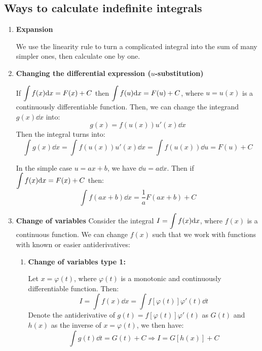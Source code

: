 \documentclass[12pt]{article}
\begin{document}
\subsection{Ways to calculate indefinite integrals}
\begin{enumerate}
    \item \textbf{Expansion} 
    \par We use the linearity rule to turn a complicated integral into the sum of many simpler ones, then calculate one by one. 
    \item \textbf{Changing the differential expression ($u$-substitution)}
\par If $\mathlarger{\int f(x) \dd x = F(x) + C}$ then $\mathlarger{\int f(u) \dd x = F(u) + C}$, where $u = u(x)$ is a continuously differentiable function. Then, we can change the integrand $g(x)\dd x$ into:
\begin{equation*}
    g(x) = f(u(x))u'(x) \dd x
\end{equation*}
Then the integral turns into:
\begin{equation*}
    \int g(x) \dd x = \int f(u(x))u'(x) \dd x = \int f(u(x)) \dd u = F(u) + C
\end{equation*}
\begin{insight}
    In the simple case $u = ax+b$, we have $\dd u = a \dd x$. Then if $\mathlarger{\int f(x) \dd x = F(x) + C}$ then:
    \begin{equation*}
        \int f(ax+b) \dd x  = \dfrac{1}{a} F(ax+b) +C
    \end{equation*}
\end{insight}
    \item \textbf{Change of variables}
Consider the integral $\mathlarger{I = \int f(x) \dd x}$, where $f(x)$ is a continuous function. We can change $f(x)$ such that we work with functions with known or easier antiderivatives:
\begin{enumerate}
    \item \textbf{Change of variables type 1:}
    \par Let $x = \varphi(t)$, where $\varphi(t)$ is a monotonic and continuously differentiable function. Then:
    \begin{equation*}
        I = \int f(x) \dd x = \int f[\varphi(t)]\varphi'(t) \dd t
    \end{equation*}
    Denote the antiderivative of $g(t) = f[\varphi(t)]\varphi'(t)$ as $G(t)$ and $h(x)$ as the inverse of $x = \varphi (t)$, we then have:
    \begin{equation*}
        \int g(t) \dd t = G(t) + C \Rightarrow I = G[h(x)] + C
    \end{equation*}


\end{enumerate}
\end{enumerate}
\end{document}

